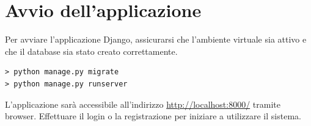 \documentclass[a4paper,12pt]{report}
\begin{document}
\section{Avvio dell'applicazione}

Per avviare l'applicazione Django, assicurarsi che l'ambiente
virtuale sia attivo e che il database
sia stato creato correttamente.

\begin{verbatim}
> python manage.py migrate
> python manage.py runserver
\end{verbatim}

L'applicazione sarà accessibile all'indirizzo
\url{http://localhost:8000/} tramite browser. Effettuare
il login o la registrazione per iniziare a utilizzare il sistema.
\end{document}
